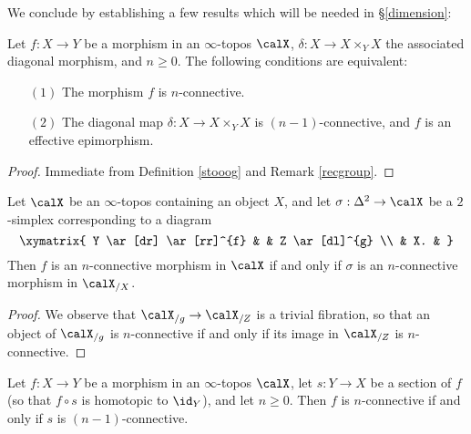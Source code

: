 We conclude by establishing a few results which will be needed in \S \ref{dimension}:

\begin{proposition}\label{trowler}
Let $f: X \rightarrow Y$ be a morphism in an $\infty$-topos $\calX$, 
$\delta: X \rightarrow X \times_{Y} X$ the associated diagonal morphism, and $n \geq 0$.
The following conditions are equivalent:
\begin{itemize}
\item[$(1)$] The morphism $f$ is $n$-connective.

\item[$(2)$] The diagonal map $\delta: X \rightarrow X \times_{Y} X$ is $(n-1)$-connective, and
$f$ is an effective epimorphism.
\end{itemize}
\end{proposition}

\begin{proof}
Immediate from Definition \ref{stooog} and Remark \ref{recgroup}.
\end{proof}

\begin{proposition}\label{conslice}
Let $\calX$ be an $\infty$-topos containing an object $X$, and let $\sigma: \Delta^2 \rightarrow \calX$ be a $2$-simplex corresponding to a diagram
$$ \xymatrix{ Y \ar[dr] \ar[rr]^{f} & & Z \ar[dl]^{g} \\
& X. & }$$
Then $f$ is an $n$-connective morphism in $\calX$ if and only if $\sigma$ is an
$n$-connective morphism in $\calX_{/X}$.
\end{proposition}

\begin{proof}
We observe that $\calX_{/g} \rightarrow \calX_{/Z}$ is a
trivial fibration, so that an object of $\calX_{/g}$ is $n$-connective if and only if its
image in $\calX_{/Z}$ is $n$-connective. 
\end{proof}

\begin{proposition}\label{sectcon}
Let $f: X \rightarrow Y$ be a morphism in an $\infty$-topos $\calX$, let
$s:Y \rightarrow X$ be a section of $f$ (so that $f \circ s$ is homotopic to $\id_{Y}$), and
let $n \geq 0$. Then $f$ is $n$-connective if and only if $s$ is $(n-1)$-connective.
\end{proposition}

